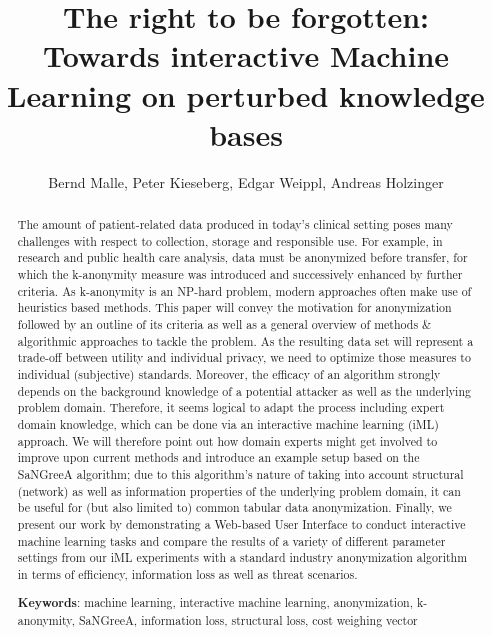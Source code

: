 \documentclass{llncs}
\begin{document}
\title{The right to be forgotten:\\
Towards interactive Machine Learning on perturbed knowledge bases}

\author{Bernd Malle, Peter Kieseberg, Edgar Weippl, Andreas Holzinger}

\maketitle

\begin{abstract}
	
The amount of patient-related data produced in today’s clinical setting poses many challenges with respect to collection, storage and responsible use. For example, in research and public health care analysis, data must be anonymized before transfer, for which the k-anonymity measure was introduced and successively enhanced by further criteria. As k-anonymity is an NP-hard problem, modern approaches often make use of heuristics based methods. This paper will convey the motivation for anonymization followed by an outline of its criteria as well as a general overview of methods \& algorithmic approaches to tackle the problem. As the resulting data set will represent a trade-off between utility and individual privacy, we need to optimize those measures to individual (subjective) standards. Moreover, the efficacy of an algorithm strongly depends on the background knowledge of a potential attacker as well as the underlying problem domain. Therefore, it seems logical to adapt the process including expert domain knowledge, which can be done via an interactive machine learning (iML) approach. We will therefore point out how domain experts might get involved to improve upon current methods and introduce an example setup based on the SaNGreeA algorithm; due to this algorithm's nature of taking into account structural (network) as well as information properties of the underlying problem domain, it can be useful for (but also limited to) common tabular data anonymization. Finally, we present our work by demonstrating a Web-based User Interface to conduct interactive machine learning tasks and compare the results of a variety of different parameter settings from our iML experiments with a standard industry anonymization algorithm in terms of efficiency, information loss as well as threat scenarios.

\medskip

\textbf{Keywords}: machine learning, interactive machine learning, anonymization, k-anonymity, SaNGreeA, information loss, structural loss, cost weighing vector


\end{abstract}
\end{document}
